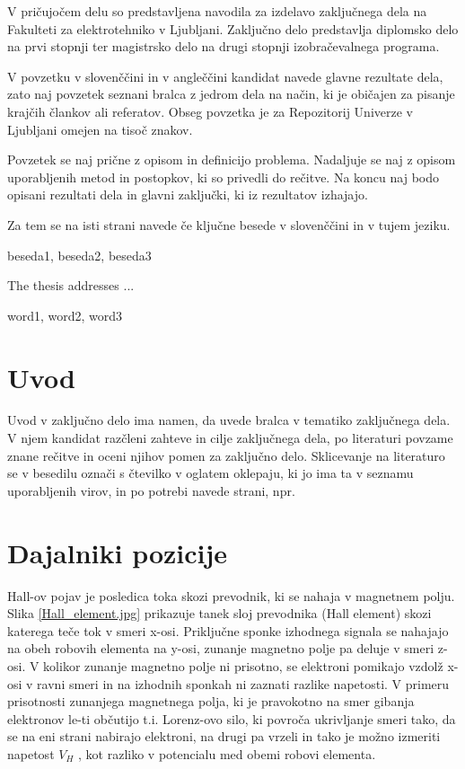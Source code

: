 \documentclass[a4paper,twoside,openright,12pt]{book}
\begin{document}
V pričujočem delu so predstavljena navodila za izdelavo zaključnega
dela na Fakulteti za elektrotehniko v Ljubljani. Zaključno delo
predstavlja diplomsko delo na prvi stopnji ter magistrsko delo na
drugi stopnji izobračevalnega programa.

V povzetku v slovenččini in v angleččini kandidat navede glavne
rezultate dela, zato naj povzetek seznani bralca z jedrom dela na
način, ki je običajen za pisanje krajčih člankov ali referatov.
Obseg povzetka je za Repozitorij Univerze v Ljubljani omejen na tisoč
znakov.

Povzetek se naj prične z opisom in definicijo problema. Nadaljuje se
naj z opisom uporabljenih metod in postopkov, ki so privedli do
rečitve. Na koncu naj bodo opisani rezultati dela in glavni zaključki, ki iz rezultatov
izhajajo.

Za tem se na isti strani navede če ključne besede v slovenččini in v
tujem jeziku.

\kljucnebesede beseda1, beseda2, beseda3


\abstract

The thesis addresses ...

\keywords word1, word2, word3


\chapter{Uvod} \label{uvod}

Uvod v zaključno delo ima namen, da uvede bralca v tematiko
zaključnega dela. V njem kandidat razčleni zahteve in cilje
zaključnega dela, po literaturi povzame znane rečitve in oceni
njihov pomen za zaključno delo. Sklicevanje na literaturo se v
besedilu označi s čtevilko v oglatem oklepaju, ki jo ima ta v
seznamu uporabljenih virov, in po potrebi navede strani, npr.
\cite{miklavvcivc2010objavljanje} 


\chapter{Dajalniki pozicije} \label{Dajalniki pozicije in hitrosti}

Hall-ov pojav je posledica toka skozi prevodnik, ki se nahaja v magnetnem polju. Slika \ref{Hall_element.jpg} prikazuje tanek sloj prevodnika (Hall element) skozi katerega teče tok v smeri x-osi. Priključne sponke izhodnega signala se nahajajo na obeh robovih elementa na y-osi,  zunanje magnetno polje pa deluje v smeri z-osi. V kolikor zunanje magnetno polje ni prisotno, se elektroni pomikajo vzdolž x-osi v ravni smeri in na izhodnih sponkah ni zaznati razlike napetosti. V primeru prisotnosti zunanjega magnetnega polja, ki je pravokotno na smer gibanja elektronov le-ti občutijo t.i. Lorenz-ovo silo, ki povroča ukrivljanje smeri tako, da se na eni strani nabirajo elektroni, na drugi pa vrzeli in tako je možno izmeriti napetost  $V_H$ , kot razliko v potencialu med obemi robovi elementa. \cite{manual-Honeywell}
\end{document}
